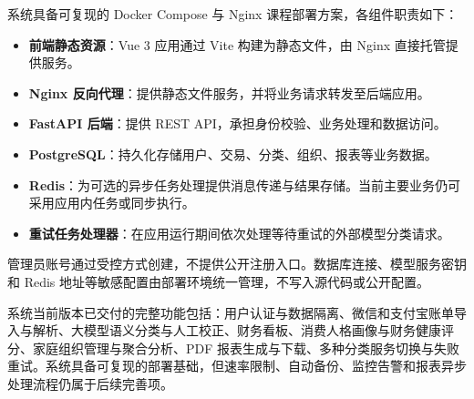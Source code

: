 系统具备可复现的 Docker Compose 与 Nginx 课程部署方案，各组件职责如下：

\begin{itemize}
  \item \textbf{前端静态资源}：Vue 3 应用通过 Vite 构建为静态文件，由 Nginx 直接托管提供服务。
  \item \textbf{Nginx 反向代理}：提供静态文件服务，并将业务请求转发至后端应用。
  \item \textbf{FastAPI 后端}：提供 REST API，承担身份校验、业务处理和数据访问。
  \item \textbf{PostgreSQL}：持久化存储用户、交易、分类、组织、报表等业务数据。
  \item \textbf{Redis}：为可选的异步任务处理提供消息传递与结果存储。当前主要业务仍可采用应用内任务或同步执行。
  \item \textbf{重试任务处理器}：在应用运行期间依次处理等待重试的外部模型分类请求。
\end{itemize}

管理员账号通过受控方式创建，不提供公开注册入口。数据库连接、模型服务密钥和 Redis 地址等敏感配置由部署环境统一管理，不写入源代码或公开配置。

系统当前版本已交付的完整功能包括：用户认证与数据隔离、微信和支付宝账单导入与解析、大模型语义分类与人工校正、财务看板、消费人格画像与财务健康评分、家庭组织管理与聚合分析、PDF 报表生成与下载、多种分类服务切换与失败重试。系统具备可复现的部署基础，但速率限制、自动备份、监控告警和报表异步处理流程仍属于后续完善项。
